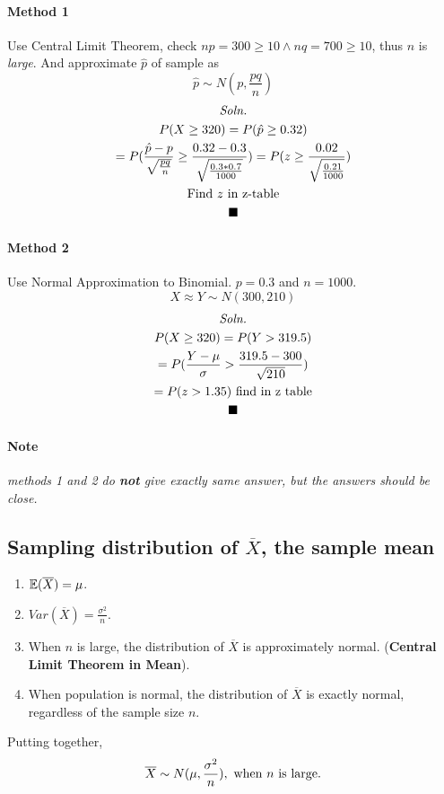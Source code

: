 \documentclass{article}
\begin{document}
			\paragraph{Method 1} Use Central Limit Theorem, check $np=300\geq10 \land nq = 700 \geq 10$, thus $n$ is \emph{large}. And approximate $\hat{p}$ of sample as
				\[
					\hat{p} \sim N(p, \frac{pq}{n})
				\]
				\begin{multline*}
					\emph{Soln.} \\
					P(X \geq 320) = P(\hat{p} \geq 0.32) \\
					= P(\frac{\hat{p} - p}{\sqrt{\frac{pq}{n}}} \geq \frac{0.32 - 0.3}{\sqrt{\frac{0.3*0.7}{1000}}}) = P(z \geq \frac{0.02}{\sqrt{\frac{0.21}{1000}}}) \\
					\text{{Find $z$ in z-table}} \\
					\blacksquare
				\end{multline*}
			
			\paragraph{Method 2} Use Normal Approximation to Binomial. $p=0.3$ and $n=1000$.
			\[
				X \approx Y \sim N(300, 210)
			\]
			\begin{multline*}
				\emph{Soln.} \\
				P(X \geq 320) = P(Y > 319.5) \\
				= P(\frac{Y - \mu}{\sigma} > \frac{319.5 - 300}{\sqrt{210}}) \\
				= P(z > 1.35) \text{{ find in z table}} \\
				\blacksquare
			\end{multline*}
			\paragraph{Note} \emph{methods 1 and 2 do \textbf{not} give exactly same answer, but the answers should be close.}
			
		\subsection{Sampling distribution of $\overline{X}$, the sample mean}
			\begin{enumerate}
				\item $\mathbb{E}({\overline{X}}) = \mu$.
				\item $Var(\overline{X}) = \frac{\sigma^2}{n}$.
				\item When $n$ is large, the distribution of $\overline{X}$ is approximately normal. (\textbf{Central Limit Theorem in Mean}).
				\item When population is normal, the distribution of $\overline{X}$ is exactly normal, regardless of the sample size $n$.
			\end{enumerate}
			Putting together,
				\[
					\overline{X} \sim N(\mu, \frac{\sigma^2}{n}), \text{{ when $n$ is large.}}
				\]
\end{document}

